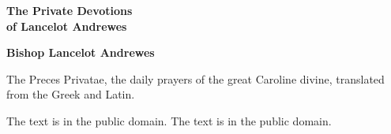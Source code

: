 \documentclass[11pt,letterpaper]{article}
\begin{document}
\color{ink}

\begin{titlepage}
\centering
\vspace*{4em}
{\LARGE\bfseries\color{heading} The Private Devotions\\[0.3em]of Lancelot Andrewes\par}
\vspace{2em}
{\Large\bfseries\color{heading} Bishop Lancelot Andrewes\par}
\vspace{2.5em}
{\itshape\color{subhead}\parbox{0.8\linewidth}{\centering The Preces Privatae, the daily prayers of the great Caroline divine, translated from the Greek and Latin.\par}}
\vfill
{\small The text is in the public domain. The text is in the public domain.\par}
\vspace{2em}
\end{titlepage}

\tableofcontents


\end{document}

